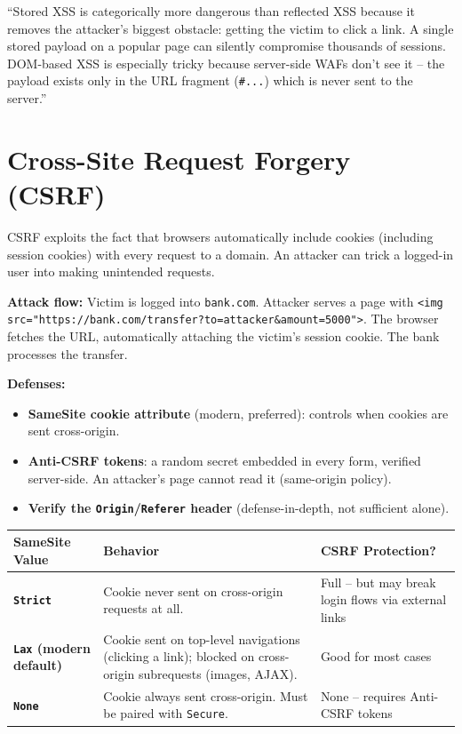 \documentclass[11pt, letterpaper]{article}
\newcommand{\talkingpoint}[1]{%
  \begin{tcolorbox}[colback=talkbg, colframe=talkborder,
    title={\bfseries Interview Talking Point}, arc=3pt, boxrule=1pt]
  #1
  \end{tcolorbox}%
}
\begin{document}
\talkingpoint{``Stored XSS is categorically more dangerous than reflected XSS because it removes the attacker's biggest obstacle: getting the victim to click a link. A single stored payload on a popular page can silently compromise thousands of sessions. DOM-based XSS is especially tricky because server-side WAFs don't see it -- the payload exists only in the URL fragment (\texttt{\#...}) which is never sent to the server.''}

\section*{Cross-Site Request Forgery (CSRF)}

CSRF exploits the fact that browsers automatically include cookies (including session cookies) with every request to a domain. An attacker can trick a logged-in user into making unintended requests.

\textbf{Attack flow:} Victim is logged into \texttt{bank.com}. Attacker serves a page with \texttt{<img src="https://bank.com/transfer?to=attacker\&amount=5000">}. The browser fetches the URL, automatically attaching the victim's session cookie. The bank processes the transfer.

\textbf{Defenses:}
\begin{itemize}[noitemsep]
  \item \textbf{SameSite cookie attribute} (modern, preferred): controls when cookies are sent cross-origin.
  \item \textbf{Anti-CSRF tokens}: a random secret embedded in every form, verified server-side. An attacker's page cannot read it (same-origin policy).
  \item \textbf{Verify the \texttt{Origin}/\texttt{Referer} header} (defense-in-depth, not sufficient alone).
\end{itemize}

\noindent
{\renewcommand{\arraystretch}{1.5}
\begin{tabularx}{\textwidth}{>{\bfseries\centering\arraybackslash}p{2.5cm}
                              >{\raggedright\arraybackslash}X
                              >{\raggedright\arraybackslash}p{3.5cm}}
\toprule
\rowcolor{tableheaderred}
\textbf{SameSite Value} & \textbf{Behavior} & \textbf{CSRF Protection?} \\
\midrule
\rowcolor{rowRe} \texttt{Strict} & Cookie never sent on cross-origin requests at all. & Full -- but may break login flows via external links \\
\rowcolor{rowA}  \texttt{Lax} (modern default) & Cookie sent on top-level navigations (clicking a link); blocked on cross-origin subrequests (images, AJAX). & Good for most cases \\
\rowcolor{rowRe} \texttt{None} & Cookie always sent cross-origin. Must be paired with \texttt{Secure}. & None -- requires Anti-CSRF tokens \\
\bottomrule
\end{tabularx}}
\end{document}
